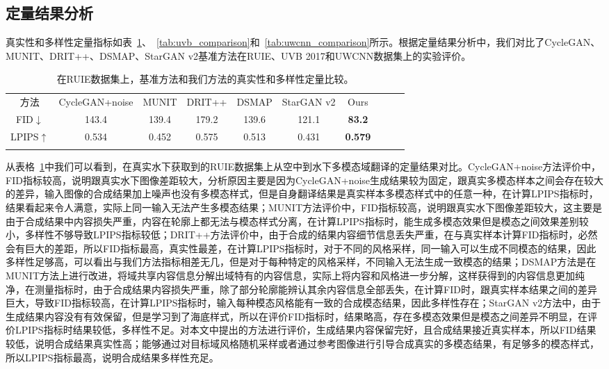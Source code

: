 \subsection{定量结果分析}

真实性和多样性定量指标如表~\ref{tab:ruie_comparison}、~\ref{tab:uvb_comparison}和~\ref{tab:uwcnn_comparison}所示。根据定量结果分析中，我们对比了CycleGAN、MUNIT、DRIT++、DSMAP、StarGAN v2基准方法在RUIE、UVB 2017和UWCNN数据集上的实验评价。

\begin{table}[ht]
\centering
\caption{在RUIE数据集上，基准方法和我们方法的真实性和多样性定量比较。}
  \begin{tabular}{c|ccccccccc}
    \hline\noalign{\smallskip}
    方法 & CycleGAN+noise & MUNIT & DRIT++ & DSMAP & StarGAN v2 & Ours \\
    \noalign{\smallskip}\hline\noalign{\smallskip}
    FID$\downarrow$ & 143.4 & 139.4 & 179.2 & 139.6 & 121.1 & \textbf{83.2} \\
    LPIPS$\uparrow$ & 0.534 & 0.452 & 0.575 & 0.513 & 0.431 & \textbf{0.579} \\
    \noalign{\smallskip}\hline
  \end{tabular}
  \label{tab:ruie_comparison}
\end{table}

从表格~\ref{tab:ruie_comparison}中我们可以看到，在真实水下获取到的RUIE数据集上从空中到水下多模态域翻译的定量结果对比。CycleGAN+noise方法评价中，FID指标较高，说明跟真实水下图像差距较大，分析原因主要是因为CycleGAN+noise生成结果较为固定，跟真实多模态样本之间会存在较大的差异，输入图像的合成结果加上噪声也没有多模态样式，但是自身翻译结果是真实样本多模态样式中的任意一种，在计算LPIPS指标时，结果看起来令人满意，实际上同一输入无法产生多模态结果；MUNIT方法评价中，FID指标较高，说明跟真实水下图像差距较大，这主要是由于合成结果中内容损失严重，内容在轮廓上都无法与模态样式分离，在计算LPIPS指标时，能生成多模态效果但是模态之间效果差别较小，多样性不够导致LPIPS指标较低；DRIT++方法评价中，由于合成的结果内容细节信息丢失严重，在与真实样本计算FID指标时，必然会有巨大的差距，所以FID指标最高，真实性最差，在计算LPIPS指标时，对于不同的风格采样，同一输入可以生成不同模态的结果，因此多样性足够高，可以看出与我们方法指标相差无几，但是对于每种特定的风格采样，不同输入无法生成一致模态的结果；DSMAP方法是在MUNIT方法上进行改进，将域共享内容信息分解出域特有的内容信息，实际上将内容和风格进一步分解，这样获得到的内容信息更加纯净，在测量指标时，由于合成结果内容损失严重，除了部分轮廓能辨认其余内容信息全部丢失，在计算FID时，跟真实样本结果之间的差异巨大，导致FID指标较高，在计算LPIPS指标时，输入每种模态风格能有一致的合成模态结果，因此多样性存在；StarGAN v2方法中，由于生成结果内容没有有效保留，但是学习到了海底样式，所以在评价FID指标时，结果略高，存在多模态效果但是模态之间差异不明显，在评价LPIPS指标时结果较低，多样性不足。对本文中提出的方法进行评价，生成结果内容保留完好，且合成结果接近真实样本，所以FID结果较低，说明合成结果真实性高；能够通过对目标域风格随机采样或者通过参考图像进行引导合成真实的多模态结果，有足够多的模态样式，所以LPIPS指标最高，说明合成结果多样性充足。

